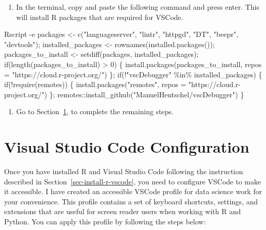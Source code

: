 \documentclass[
  letterpaper,
  DIV=11,
  numbers=noendperiod]{scrartcl}
\newenvironment{Shaded}{\begin{snugshade}}{\end{snugshade}}
\newcommand{\AttributeTok}[1]{\textcolor[rgb]{0.40,0.45,0.13}{#1}}
\newcommand{\ExtensionTok}[1]{\textcolor[rgb]{0.00,0.23,0.31}{#1}}
\newcommand{\StringTok}[1]{\textcolor[rgb]{0.13,0.47,0.30}{#1}}
\providecommand{\tightlist}{%
  \setlength{\itemsep}{0pt}\setlength{\parskip}{0pt}}\usepackage{longtable,booktabs,array}
\begin{document}
\begin{enumerate}
\def\labelenumi{\arabic{enumi}.}
\setcounter{enumi}{2}
\tightlist
\item
  In the terminal, copy and paste the following command and press enter.
  This will install R packages that are required for VSCode.
\end{enumerate}

\begin{Shaded}
\begin{Highlighting}[]
\ExtensionTok{Rscript} \AttributeTok{{-}e} \StringTok{\textquotesingle{}packages \textless{}{-} c("languageserver", "lintr", "httpgd", "DT", "beepr", "devtools"); installed\_packages \textless{}{-} rownames(installed.packages()); packages\_to\_install \textless{}{-} setdiff(packages, installed\_packages); if(length(packages\_to\_install) \textgreater{} 0) \{ install.packages(packages\_to\_install, repos = "https://cloud.r{-}project.org/") \}; if(!"vscDebugger" \%in\% installed\_packages) \{ if(!require(remotes)) \{ install.packages("remotes", repos = "https://cloud.r{-}project.org/") \}; remotes::install\_github("ManuelHentschel/vscDebugger") \}\textquotesingle{}}
\end{Highlighting}
\end{Shaded}

\begin{enumerate}
\def\labelenumi{\arabic{enumi}.}
\setcounter{enumi}{3}
\tightlist
\item
  Go to Section~\ref{sec-vscode-configuration}, to complete the
  remaining steps.
\end{enumerate}

\hypertarget{sec-vscode-configuration}{%
\section{Visual Studio Code
Configuration}\label{sec-vscode-configuration}}

Once you have installed R and Visual Studio Code following the
instruction described in Section~\ref{sec-install-r-vscode}, you need to
configure VSCode to make it accessible. I have created an accessible
VSCode profile for data science work for your convenience. This profile
contains a set of keyboard shortcuts, settings, and extensions that are
useful for screen reader users when working with R and Python. You can
apply this profile by following the steps below:
\end{document}
